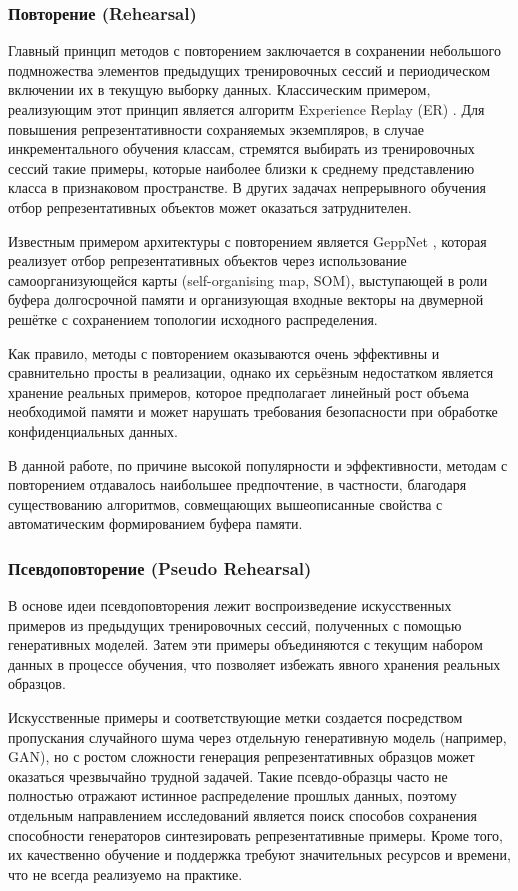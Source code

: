 \documentclass[a4paper,14pt]{extarticle}
\begin{document}
\subsubsection{Повторение (Rehearsal)}
Главный принцип методов с повторением заключается в сохранении небольшого
подмножества элементов предыдущих тренировочных сессий и периодическом
включении их в текущую выборку данных. Классическим примером, реализующим этот
принцип является алгоритм Experience Replay (ER) \cite{rolnick2019experience}.
Для повышения репрезентативности сохраняемых экземпляров, в случае
инкрементального обучения классам, стремятся выбирать из тренировочных сессий
такие примеры, которые наиболее близки к среднему представлению класса в
признаковом пространстве. В других задачах непрерывного обучения отбор
репрезентативных объектов может оказаться затруднителен.

Известным примером архитектуры с повторением является GeppNet
\cite{gepperth2016bioinspired}, которая реализует отбор репрезентативных
объектов через использование самоорганизующейся карты (self-organising map, SOM),
выступающей в роли буфера долгосрочной памяти и организующая входные векторы на
двумерной решётке с сохранением топологии исходного распределения.

Как правило, методы с повторением оказываются очень эффективны и сравнительно
просты в реализации, однако их серьёзным недостатком является хранение реальных
примеров, которое предполагает линейный рост объема необходимой памяти и может
нарушать требования безопасности при обработке конфиденциальных данных.

В данной работе, по причине высокой популярности и эффективности, методам с
повторением отдавалось наибольшее предпочтение, в частности, благодаря
существованию алгоритмов, совмещающих вышеописанные свойства с автоматическим
формированием буфера памяти.
\subsubsection{Псевдоповторение (Pseudo Rehearsal)}
В основе идеи псевдоповторения лежит воспроизведение искусственных примеров
из предыдущих тренировочных сессий, полученных с помощью генеративных
моделей. Затем эти примеры объединяются с текущим набором данных в
процессе обучения, что позволяет избежать явного хранения реальных образцов.

Искусственные примеры и соответствующие метки создается посредством пропускания
случайного шума через отдельную генеративную модель (например, GAN), но с ростом
сложности генерация репрезентативных образцов может оказаться чрезвычайно
трудной задачей. Такие псевдо-образцы часто не полностью отражают истинное
распределение прошлых данных, поэтому отдельным направлением исследований
является поиск способов сохранения способности генераторов синтезировать
репрезентативные примеры. Кроме того, их качественно обучение и поддержка
требуют значительных ресурсов и времени, что не всегда реализуемо на практике.
\end{document}
